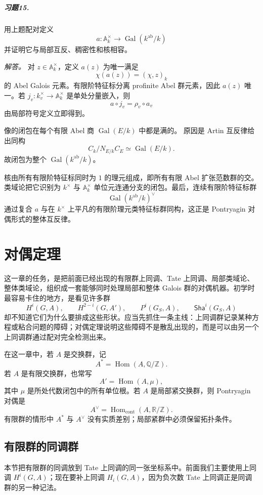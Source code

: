 \documentclass[11pt,a4paper,openany]{ctexbook}
\numberwithin{equation}{chapter}
\newcommand{\Q}{\mathbb{Q}}
\newcommand{\R}{\mathbb{R}}
\newcommand{\Z}{\mathbb{Z}}
\newcommand{\A}{\mathbb{A}}
\newcommand{\Gal}{\operatorname{Gal}}
\newcommand{\Hom}{\operatorname{Hom}}
\newcommand{\Sha}{\mathsf{Sha}}
\theoremstyle{plain}
\theoremstyle{definition}
\theoremstyle{remark}
\begin{document}
\paragraph{习题15.}
用上题配对定义
\[
a:\A_k^\times\to\Gal(k^{\operatorname{ab}}/k)
\]
并证明它与局部互反、稠密性和核相容。

\emph{解答。}
对 $z\in\A_k^\times$，定义 $a(z)$ 为唯一满足
\[
\chi(a(z))=(\chi,z)_k
\]
的 Abel Galois 元素。有限阶特征标分离 profinite Abel 群元素，因此 $a(z)$ 唯一。若 $j_v:k_v^\times\to\A_k^\times$ 是单处分量嵌入，则
\[
a\circ j_v=\rho_v\circ a_v
\]
由局部符号定义立即得到。

像的闭包在每个有限 Abel 商 $\Gal(E/k)$ 中都是满的。
原因是 Artin 互反律给出同构
\[
C_k/N_{E/k}C_E\simeq\Gal(E/k).
\]
故闭包为整个 $\Gal(k^{\operatorname{ab}}/k)$。

核由所有有限阶特征标同时为 $1$ 的理元组成，即所有有限 Abel 扩张范数群的交。类域论把它识别为 $k^\times$ 与 $\A_k^\times$ 单位元连通分支的闭包。最后，连续有限阶特征标群
\[
\Gal(k^{\operatorname{ab}}/k)^\vee
\]
通过复合 $a$ 与在 $k^\times$ 上平凡的有限阶理元类特征标群同构，这正是 Pontryagin 对偶形式的整体互反律。
 \chapter{对偶定理}

这一章的任务，是把前面已经出现的有限群上同调、Tate 上同调、局部类域论、整体类域论，组织成一套能够同时处理局部和整体 Galois 群的对偶机器。初学时最容易卡住的地方，是看见许多群
\[
H^i(G,A),\qquad H^{2-i}(G,A'),\qquad P^i(G_S,A),\qquad \Sha^i(G_S,A)
\]
却不知道它们为什么要排成这些形状。应当先抓住一条主线：上同调群记录某种方程或粘合问题的障碍；对偶定理说明这些障碍不是散乱出现的，而是可以由另一个上同调群通过配对完全检测出来。

在这一章中，若 $A$ 是交换群，记
\[
A^*=\Hom(A,\Q/\Z).
\]
若 $A$ 是有限交换群，也常写
\[
A'=\Hom(A,\mu),
\]
其中 $\mu$ 是所处代数闭包中的所有单位根。若 $A$ 是局部紧交换群，则 Pontryagin 对偶是
\[
A^\vee=\Hom_{\mathrm{cont}}(A,\R/\Z).
\]
有限群的情形中 $A^*$ 与 $A^\vee$ 没有实质差别；局部紧群中必须保留拓扑条件。

\section{有限群的同调群}

本节把有限群的同调放到 Tate 上同调的同一张坐标系中。前面我们主要使用上同调 $H^i(G,A)$；现在要补上同调 $H_i(G,A)$，因为负次数 Tate 上同调正是同调群的另一种记法。
\end{document}
